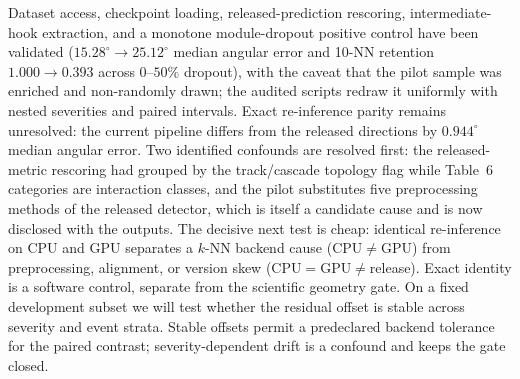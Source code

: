 \documentclass[10pt,twocolumn]{extarticle}
\begin{document}
Dataset access, checkpoint loading, released-prediction rescoring,
intermediate-hook extraction, and a monotone module-dropout positive control
have been validated ($15.28^\circ\!\to\!25.12^\circ$ median angular error and
10-NN retention $1.000\!\to\!0.393$ across $0$--$50\%$ dropout), with the
caveat that the pilot sample was enriched and non-randomly drawn; the audited
scripts redraw it uniformly with nested severities and paired intervals.
Exact re-inference parity remains unresolved: the current pipeline differs
from the released directions by $0.944^\circ$ median angular error. Two
identified confounds are resolved first: the released-metric rescoring had
grouped by the track/cascade topology flag while Table~6 categories are
interaction classes, and the pilot substitutes five preprocessing methods of
the released detector, which is itself a candidate cause and is now disclosed
with the outputs. The decisive next test is cheap: identical re-inference on
CPU and GPU separates a $k$-NN backend cause (CPU$\neq$GPU) from
preprocessing, alignment, or version skew (CPU$=$GPU$\neq$release). Exact
identity is a software control, separate from the scientific geometry gate. On
a fixed development subset we will test whether the residual offset is stable
across severity and event strata. Stable offsets permit a predeclared backend
tolerance for the paired contrast; severity-dependent drift is a confound and
keeps the gate closed.
\end{document}

